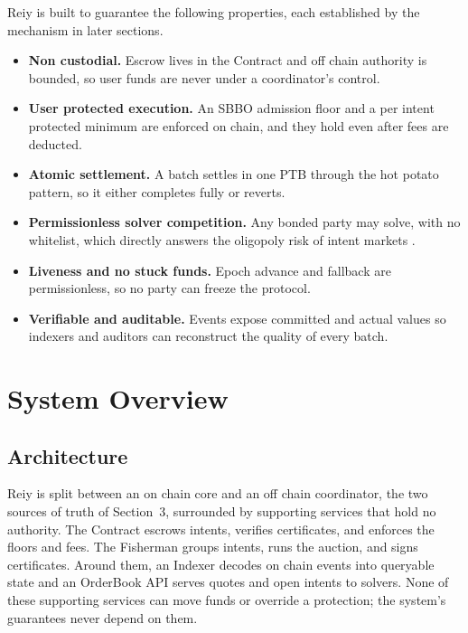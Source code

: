 \documentclass[10pt,sigconf,nonacm]{acmart}
\theoremstyle{reiythm}
\begin{document}
Reiy is built to guarantee the following properties, each established by the
mechanism in later sections.

\begin{itemize}
  \item \textbf{Non custodial.} Escrow lives in the Contract and off chain
    authority is bounded, so user funds are never under a coordinator's control.
  \item \textbf{User protected execution.} An SBBO admission floor and a per
    intent protected minimum are enforced on chain, and they hold even after
    fees are deducted.
  \item \textbf{Atomic settlement.} A batch settles in one PTB through the hot
    potato pattern, so it either completes fully or reverts.
  \item \textbf{Permissionless solver competition.} Any bonded party may solve,
    with no whitelist, which directly answers the oligopoly risk of intent
    markets \cite{chitra2024analysisintentbasedmarkets}.
  \item \textbf{Liveness and no stuck funds.} Epoch advance and fallback are
    permissionless, so no party can freeze the protocol.
  \item \textbf{Verifiable and auditable.} Events expose committed and actual
    values so indexers and auditors can reconstruct the quality of every batch.
\end{itemize}

\section{System Overview}

\subsection{Architecture}

Reiy is split between an on chain core and an off chain coordinator, the two
sources of truth of Section~3, surrounded by supporting services that hold no
authority. The Contract escrows intents, verifies certificates, and enforces the
floors and fees. The Fisherman groups intents, runs the auction, and signs
certificates. Around them, an Indexer decodes on chain events into queryable
state and an OrderBook API serves quotes and open intents to solvers. None of
these supporting services can move funds or override a protection; the system's
guarantees never depend on them.
\end{document}
